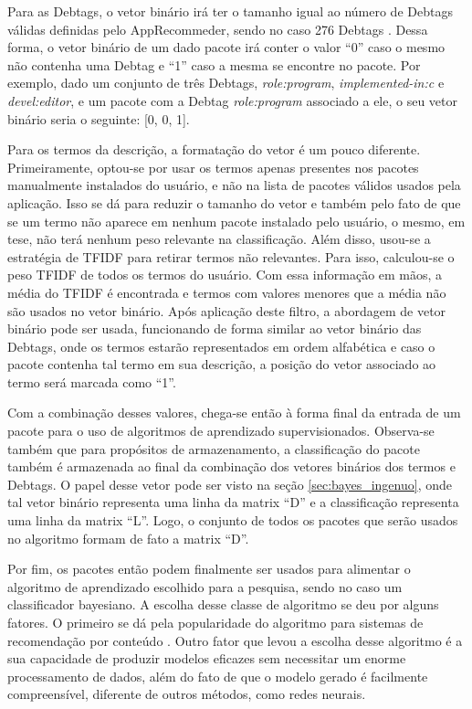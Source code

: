 Para as Debtags, o vetor binário irá ter o tamanho igual ao número de Debtags
válidas definidas pelo AppRecommeder, sendo no caso 276 Debtags
\cite{araujo2011apprecommender}. Dessa forma,
o vetor binário de um dado pacote irá conter o valor ``0'' caso o mesmo não
contenha uma Debtag e ``1'' caso a mesma se encontre
no pacote. Por exemplo, dado um conjunto de três Debtags, \textit{role:program},
\textit{implemented-in:c} e \textit{devel:editor}, e um pacote com a Debtag
\textit{role:program} associado a ele, o seu vetor binário seria o seguinte: [0, 0, 1].

Para os termos da descrição, a formatação do vetor é um pouco diferente. Primeiramente, optou-se por usar os termos apenas presentes
nos pacotes manualmente instalados do usuário, e não na lista de pacotes válidos
usados pela aplicação. Isso se dá para reduzir o tamanho do vetor e também
pelo fato de que se um termo não aparece em nenhum pacote instalado pelo
usuário, o mesmo, em tese, não terá nenhum peso relevante na
classificação. Além disso, usou-se a estratégia de TFIDF para retirar termos não
relevantes. Para isso, calculou-se o peso TFIDF de todos os termos do usuário.
Com essa informação em mãos, a média do TFIDF é encontrada e termos com valores menores que a
média não são usados no vetor binário. Após aplicação deste filtro, a abordagem de vetor binário pode ser usada, funcionando de forma
similar ao vetor binário das Debtags, onde os termos estarão representados em ordem alfabética e caso o pacote contenha tal termo em sua
descrição, a posição do vetor associado ao termo será marcada como ``1''.

Com a combinação desses valores, chega-se então à forma final da entrada de um pacote para o uso de algoritmos de aprendizado
supervisionados. Observa-se também que para propósitos de armazenamento, a classificação do pacote também é armazenada ao final da combinação
dos vetores binários dos termos e Debtags. O papel desse vetor pode ser visto na
seção \ref{sec:bayes_ingenuo}, onde tal vetor binário representa uma linha da
matrix ``D'' e a classificação representa uma linha da matrix ``L''. Logo, o
conjunto de todos os pacotes que serão usados no algoritmo formam de fato a
matrix ``D''.

Por fim, os pacotes então podem finalmente ser usados para alimentar o algoritmo de aprendizado escolhido para a pesquisa, sendo no caso um
classificador bayesiano. A escolha desse classe de algoritmo se deu por alguns fatores. O primeiro se dá pela popularidade do algoritmo para
sistemas de recomendação por conteúdo \cite{amatriain2011data}. Outro fator que levou a escolha desse algoritmo é a sua capacidade de produzir
modelos eficazes sem necessitar um enorme processamento de dados, além do fato
de que o modelo gerado é facilmente compreensível, diferente de outros métodos,
como redes neurais\cite{segaran2007programming}.

